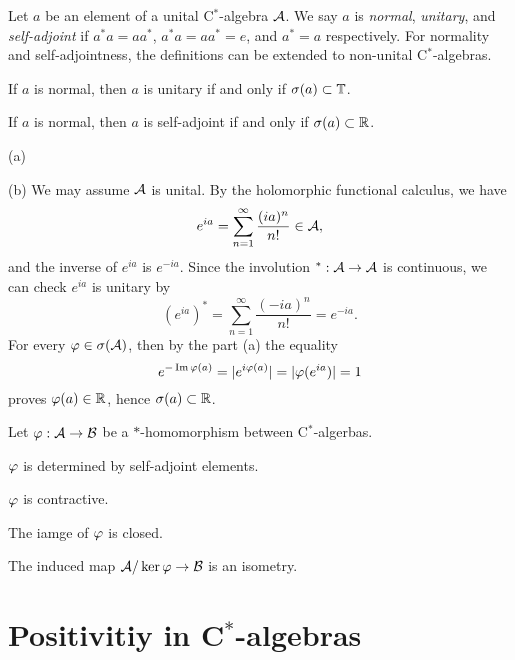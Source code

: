 \documentclass{../../large}
\begin{document}
\begin{prb}
Let $a$ be an element of a unital C$^*$-algebra $\mathcal{A}$.
We say $a$ is \emph{normal}, \emph{unitary}, and \emph{self-adjoint} if $a^*a=aa^*$, $a^*a=aa^*=e$, and $a^*=a$ respectively.
For normality and self-adjointness, the definitions can be extended to non-unital C$^*$-algebras.
\begin{parts}
\item If $a$ is normal, then $a$ is unitary if and only if $\sigma(a)\subset\mathbb{T}$.
\item If $a$ is normal, then $a$ is self-adjoint if and only if $\sigma(a)\subset\mathbb{R}$.
\end{parts}
\end{prb}
\begin{pf}
(a)

(b)
We may assume $\mathcal{A}$ is unital.
By the holomorphic functional calculus, we have
\[e^{ia}=\sum_{n=1}^\infty\frac{(ia)^n}{n!}\in\mathcal{A},\]
and the inverse of $e^{ia}$ is $e^{-ia}$.
Since the involution $^*:\mathcal{A}\to\mathcal{A}$ is continuous, we can check $e^{ia}$ is unitary by
\[(e^{ia})^*=\sum_{n=1}^\infty\frac{(-ia)^n}{n!}=e^{-ia}.\]
For every $\varphi\in\sigma(\mathcal{A})$, then by the part (a) the equality
\[e^{-\operatorname{Im}\varphi(a)}=|e^{i\varphi(a)}|=|\varphi(e^{ia})|=1\]
proves $\varphi(a)\in\mathbb{R}$, hence $\sigma(a)\subset\mathbb{R}$.
\end{pf}

\begin{prb}[$*$-homomorphism]
Let $\varphi:\mathcal{A}\to\mathcal{B}$ be a $*$-homomorphism between C$^*$-algerbas.
\begin{parts}
\item $\varphi$ is determined by self-adjoint elements.
\item $\varphi$ is contractive.
\item The iamge of $\varphi$ is closed.
\item The induced map $\mathcal{A}/\ker\varphi\to\mathcal{B}$ is an isometry.
\end{parts}
\end{prb}



\section{Positivitiy in C$^*$-algebras}
\end{document}
